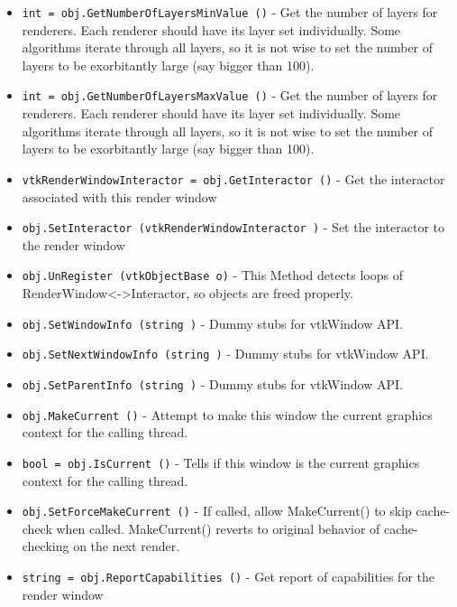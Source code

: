 \begin{itemize}
\item  \verb|int = obj.GetNumberOfLayersMinValue ()| -  Get the number of layers for renderers.  Each renderer should have
 its layer set individually.  Some algorithms iterate through all layers,
 so it is not wise to set the number of layers to be exorbitantly large
 (say bigger than 100).

\item  \verb|int = obj.GetNumberOfLayersMaxValue ()| -  Get the number of layers for renderers.  Each renderer should have
 its layer set individually.  Some algorithms iterate through all layers,
 so it is not wise to set the number of layers to be exorbitantly large
 (say bigger than 100).

\item  \verb|vtkRenderWindowInteractor = obj.GetInteractor ()| -  Get the interactor associated with this render window

\item  \verb|obj.SetInteractor (vtkRenderWindowInteractor )| -  Set the interactor to the render window

\item  \verb|obj.UnRegister (vtkObjectBase o)| -  This Method detects loops of RenderWindow<->Interactor,
 so objects are freed properly.

\item  \verb|obj.SetWindowInfo (string )| -  Dummy stubs for vtkWindow API.

\item  \verb|obj.SetNextWindowInfo (string )| -  Dummy stubs for vtkWindow API.

\item  \verb|obj.SetParentInfo (string )| -  Dummy stubs for vtkWindow API.

\item  \verb|obj.MakeCurrent ()| -  Attempt to make this window the current graphics context for the calling
 thread.

\item  \verb|bool = obj.IsCurrent ()| -  Tells if this window is the current graphics context for the calling
 thread.

\item  \verb|obj.SetForceMakeCurrent ()| -  If called, allow MakeCurrent() to skip cache-check when called.
 MakeCurrent() reverts to original behavior of cache-checking
 on the next render.

\item  \verb|string = obj.ReportCapabilities ()| -  Get report of capabilities for the render window


\end{itemize}
